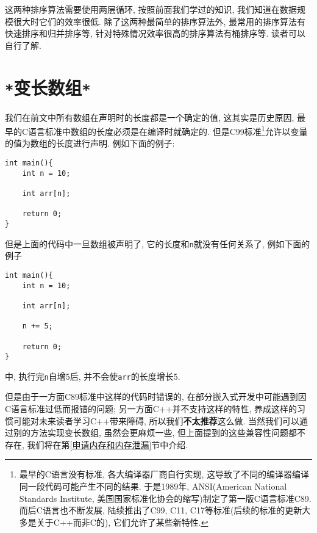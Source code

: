         这两种排序算法需要使用两层循环, 按照前面我们学过的知识, 我们知道在数据规模很大时它们的效率很低. 除了这两种最简单的排序算法外, 最常用的排序算法有快速排序和归并排序等, 针对特殊情况效率很高的排序算法有桶排序等. 读者可以自行了解.

    \section{\texttt{*}变长数组\texttt{*}} \label{变长数组}
        我们在前文中所有数组在声明时的长度都是一个确定的值, 这其实是历史原因, 最早的C语言标准中数组的长度必须是在编译时就确定的. 但是C99标准\footnote{最早的C语言没有标准, 各大编译器厂商自行实现, 这导致了不同的编译器编译同一段代码可能产生不同的结果. 于是1989年, ANSI(American National Standards Institute, 美国国家标准化协会的缩写)制定了第一版C语言标准C89. 而后C语言也不断发展, 陆续推出了C99, C11, C17等标准(后续的标准的更新大多是关于C++而非C的), 它们允许了某些新特性.}允许以变量的值为数组的长度进行声明. 例如下面的例子:
\begin{lstlisting}
int main(){
    int n = 10;
    
    int arr[n];

    return 0;
}
\end{lstlisting}

        但是上面的代码中一旦数组被声明了, 它的长度和\texttt{n}就没有任何关系了, 例如下面的例子
\begin{lstlisting}
int main(){
    int n = 10;
    
    int arr[n];

    n += 5;

    return 0;
}
\end{lstlisting}
        中, 执行完\texttt{n}自增5后, 并不会使\texttt{arr}的长度增长5.

        但是由于一方面C89标准中这样的代码时错误的, 在部分嵌入式开发中可能遇到因C语言标准过低而报错的问题; 另一方面C++并不支持这样的特性, 养成这样的习惯可能对未来读者学习C++带来障碍, 所以我们\textbf{不太推荐}这么做. 当然我们可以通过别的方法实现变长数组, 虽然会更麻烦一些, 但上面提到的这些兼容性问题都不存在, 我们将在第\ref{申请内存和内存泄漏}节中介绍.